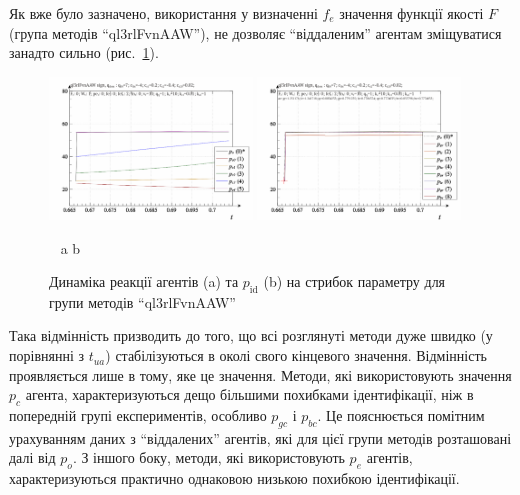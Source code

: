 Як вже було зазначено, використання у визначенні
$f_e$ значення функції якості
$F$ (група методів ``ql3rlFvnAAW''), не дозволяє ``віддаленим'' агентам
зміщуватися занадто сильно (рис.~\ref{atu:f:ql3rlFvnAAW_sign}).

\begin{figure}[htb!]
  \begin{center}
    \includegraphics[width=0.48\textwidth]{p/sign/qls-p_t_pi_m_ql3rlFvnAAW_sign.png}
    \hfill
    \includegraphics[width=0.48\textwidth]{p/sign/qls-p_t_p_m_ql3rlFvnAAW_sign.png}
  \end{center}
  \vspace{-1.0ex}
  \begin{center}
    ~ \hfill a \hfill\hfill b  \hfill ~
  \end{center}
  \vspace{-1.5ex}
  \caption{Динаміка реакції агентів (a) та $p_\mathrm{id}$ (b) на стрибок параметру для групи методів ``ql3rlFvnAAW''}
  \label{atu:f:ql3rlFvnAAW_sign}
\end{figure}

Така відмінність призводить до того, що всі розглянуті методи
дуже швидко (у порівнянні з $t_{ua}$) стабілізуються в околі свого кінцевого
значення. Відмінність проявляється лише в тому, яке це
значення. Методи, які використовують значення
$p_c$ агента, характеризуються дещо більшими похибками
ідентифікації, ніж в попередній групі експериментів, особливо
$p_{gc}$ і
$p_{bc}$. Це пояснюється помітним урахуванням даних з ``віддалених''
агентів, які для цієї групи методів розташовані далі від
$p_o$. З іншого боку, методи, які використовують
$p_e$ агентів, характеризуються практично однаковою низькою
похибкою ідентифікації.


